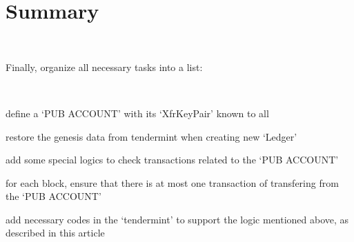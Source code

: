 \section{Summary}

~\par

Finally, organize all necessary tasks into a list:

~\par

\begin{ENUMERATE}
    \item define a `PUB ACCOUNT' with its `XfrKeyPair' known to all
    \item restore the genesis data from tendermint when creating new `Ledger'
    \item add some special logics to check transactions related to the `PUB ACCOUNT'
    \item for each block, ensure that there is at most one transaction of transfering from the `PUB ACCOUNT'
    \item add necessary codes in the `tendermint' to support the logic mentioned above, as described in this article
\end{ENUMERATE}